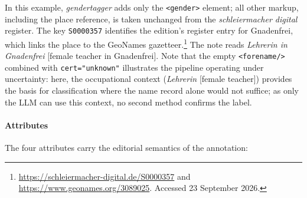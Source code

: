 \documentclass{eceasst}
\begin{document}
In this example, \textit{gendertagger} adds only the \texttt{<gender>} element; all other markup, including the place reference, is taken unchanged from the \textit{schleiermacher digital} register. The key \texttt{S0000357} identifies the edition's register entry for Gnadenfrei, which links the place to the GeoNames gazetteer.\footnote{\url{https://schleiermacher-digital.de/S0000357} and \url{https://www.geonames.org/3089025}. Accessed 23 September 2026.} The note reads \emph{Lehrerin in Gnadenfrei} [female teacher in Gnadenfrei]. Note that the empty \texttt{<forename/>} combined with \texttt{cert="unknown"} illustrates the pipeline operating under uncertainty: here, the occupational context (\emph{Lehrerin} [female teacher]) provides the basis for classification where the name record alone would not suffice; as only the LLM can use this context, no second method confirms the label.

\paragraph{Attributes} The four attributes carry the editorial semantics of the annotation:
\end{document}
